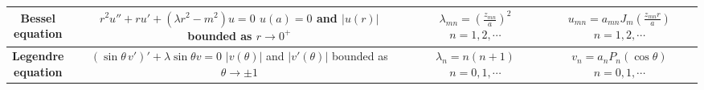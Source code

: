 \begin{center}
\begin{tabular}{|c|c|c|c|}
    \parbox[c][30pt]{90pt}{\centering \textbf{Bessel \\ \vspace{10pt} equation}} & 
    \parbox[c][80pt]{130pt}{\centering $r^{2}u'' + r u'+ (\lambda r^{2} - m^{2}) u=0$ \\ \vspace{10pt} $u(a)=0$ and $|u(r)|$ \\ \vspace{10pt} bounded as $r\to 0^{+}$}
    & 
    \parbox[c][60pt]{100pt}{\centering $\displaystyle \lambda_{mn}=\left( \frac{z_{mn}}{a} \right)^{2}$ \\ \vspace{10pt} $n=1, 2, \cdots$} & 
    \parbox[c][60pt]{120pt}{\centering $ u_{mn} = a_{mn}J_{m}\left( \frac{z_{mn}r}{a} \right)$ \\ \vspace{10pt} $n=1, 2, \cdots$} \\
    \hline
    
    \parbox[c][30pt]{90pt}{\centering \textbf{Legendre \\ \vspace{10pt} equation}} & 
    \parbox[c][80pt]{120pt}{\centering $(\sin\theta \,v')' + \lambda \sin \theta v=0$ \\ \vspace{10pt} $|v(\theta)|$ and $|v'(\theta)|$ \\ \vspace{10pt} bounded as $\theta \to \pm 1$}
    & 
    \parbox[c][60pt]{100pt}{\centering $\displaystyle \lambda_{n}=n(n+1)$ \\ \vspace{10pt} $n=0, 1, \cdots$} & 
    \parbox[c][60pt]{120pt}{\centering $ v_{n} = a_{n}P_{ n} (\cos \theta )$\\ \vspace{10pt} $n=0, 1, \cdots$} \\
    \hline
\end{tabular}
\end{center}


